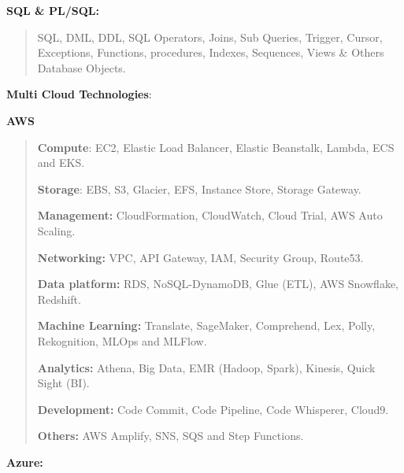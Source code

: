 \documentclass[a4paper]{article}
\begin{document}
\textbf{SQL \& PL/SQL:}

\begin{quote}
SQL, DML, DDL, SQL Operators, Joins, Sub Queries, Trigger, Cursor,
Exceptions, Functions, procedures, Indexes, Sequences, Views \& Others
Database Objects.
\end{quote}

\textbf{Multi Cloud Technologies}:

\textbf{AWS}

\begin{quote}
\textbf{Compute}: EC2, Elastic Load Balancer, Elastic Beanstalk, Lambda,
ECS and EKS.

\textbf{Storage}: EBS, S3, Glacier, EFS, Instance Store, Storage
Gateway.

\textbf{Management:} CloudFormation, CloudWatch, Cloud Trial, AWS Auto
Scaling.

\textbf{Networking:} VPC, API Gateway, IAM, Security Group, Route53.

\textbf{Data platform:} RDS, NoSQL-DynamoDB, Glue (ETL), AWS Snowflake,
Redshift.

\textbf{Machine Learning:} Translate, SageMaker, Comprehend, Lex, Polly,
Rekognition, MLOps and MLFlow.

\textbf{Analytics:} Athena, Big Data, EMR (Hadoop, Spark), Kinesis,
Quick Sight (BI).

\textbf{Development:} Code Commit, Code Pipeline, Code Whisperer,
Cloud9.

\textbf{Others:} AWS Amplify, SNS, SQS and Step Functions.
\end{quote}

\textbf{Azure:}
\end{document}

